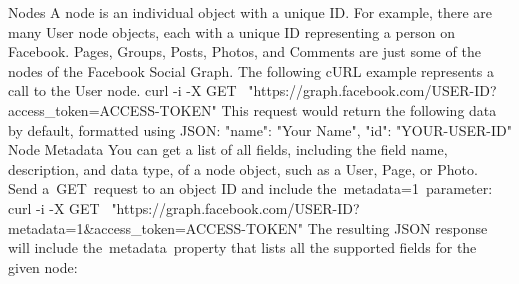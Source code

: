 Nodes
A node is an individual object with a unique ID. For example, there are many User node objects, each with a unique ID representing a person on Facebook. Pages, Groups, Posts, Photos, and Comments are just some of the nodes of the Facebook Social Graph.
The following cURL example represents a call to the User node.
curl -i -X GET \
  "https://graph.facebook.com/USER-ID?access_token=ACCESS-TOKEN"
This request would return the following data by default, formatted using JSON:
{
  "name": "Your Name",
  "id": "YOUR-USER-ID"
}
Node Metadata
You can get a list of all fields, including the field name, description, and data type, of a node object, such as a User, Page, or Photo. Send a GET request to an object ID and include the metadata=1 parameter:
curl -i -X GET \
  "https://graph.facebook.com/USER-ID?
    metadata=1&access_token=ACCESS-TOKEN"
The resulting JSON response will include the metadata property that lists all the supported fields for the given node:
